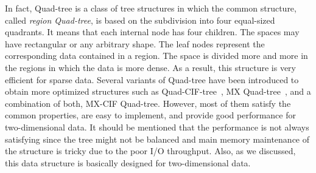 \documentclass[a4paper,12pt]{article}
\begin{document}
In fact, Quad-tree is a class of tree structures in which the common structure, called \textit{region Quad-tree}, is based on the subdivision into four equal-sized quadrants. It means that each internal node has four children. The spaces may have rectangular or any arbitrary shape. The leaf nodes represent the corresponding data contained in a region. The space is divided more and more in the regions in which the data is more dense. As a result, this structure is very efficient for sparse data.
Several variants of Quad-tree have been introduced to obtain more optimized structures such as Quad-CIF-tree~\cite{quadcif}, MX Quad-tree~\cite{quadmx}, and a combination of both, MX-CIF Quad-tree. However, most of them satisfy the common properties, are easy to implement, and provide good performance for two-dimensional data.
It should be mentioned that the performance is not always satisfying since the tree might not be balanced and main memory maintenance of the structure is tricky due to the poor I/O throughput. Also, as we discussed, this data structure is basically designed for two-dimensional data. %
\end{document}
